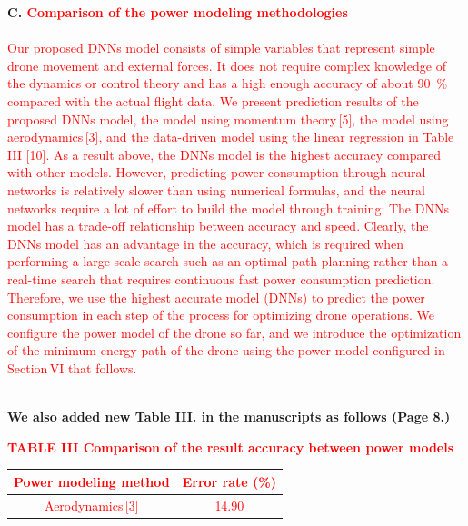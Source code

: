 \documentclass[onecolumn]{IEEEconf}
\begin{document}
\begin{description}
    \begin{mdframed}[ linewidth=.75pt, userdefinedwidth=0.9\textwidth]
    \textbf{C. \textcolor{red}{Comparison of the power modeling methodologies}}~\\
    ~\\
    \textcolor{red}{Our proposed DNNs model consists of simple variables that represent simple drone movement and external forces. It does not require complex knowledge of the dynamics or control theory and has a high enough accuracy of about 90~\% compared with the actual flight data.}
    \textcolor{red}{We present prediction results of the proposed DNNs model, the model using momentum theory\,[5], the model using aerodynamics\,[3], and the data-driven model using the linear regression in Table\,III [10].
    As a result above, the DNNs model is the highest accuracy compared with other models.
    However, predicting power consumption through neural networks is relatively slower than using numerical formulas, and the neural networks require a lot of effort to build the model through training: The DNNs model has a trade-off relationship between accuracy and speed.
    Clearly, the DNNs model has an advantage in the accuracy, which is required when performing a large-scale search such as an optimal path planning rather than a real-time search that requires continuous fast power consumption prediction.
    Therefore, we use the highest accurate model (DNNs) to predict the power consumption in each step of the process for optimizing drone operations.
    We configure the power model of the drone so far, and we introduce the optimization of the minimum energy path of the drone using the power model configured in Section\,VI that follows.}
    ~\\
    \end{mdframed}
    ~\\
    \textbf{We also added new Table III. in the manuscripts as follows (Page 8.)}\\
    \begin{mdframed}[ linewidth=.75pt, userdefinedwidth=0.9\textwidth]
    \centering
    \textcolor{red}{
    \textbf{TABLE III Comparison of the result accuracy between power models}~\\
    \begin{tabular}{|c|c|}
    \hline
    {Power modeling method} &  {Error rate (\%)} \\ \hline
    {Aerodynamics\,[3]}          & { 14.90}           \\ \hline

\end{tabular}}
\end{mdframed}
\end{description}
\end{document}

